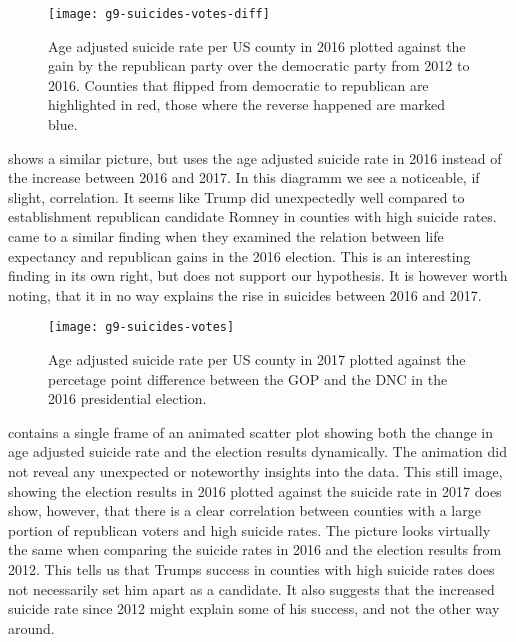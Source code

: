 \begin{figure}[tb]
\centering
\texttt{[image: g9-suicides-votes-diff]}
\caption{Age adjusted suicide rate per US county in 2016 plotted against the gain by the republican party over the democratic party from 2012 to 2016. Counties that flipped from democratic to republican are highlighted in red, those where the reverse happened are marked blue.}
\label{fig:suicides-votes-diff}
\end{figure}

\par
{} shows a similar picture, but uses the age adjusted suicide rate in 2016 instead of the increase between 2016 and 2017.
In this diagramm we see a noticeable, if slight, correlation.
It seems like Trump did unexpectedly well compared to establishment republican candidate Romney in counties with high suicide rates.
\cite{goldman2018} came to a similar finding when they examined the relation between life expectancy and republican gains in the 2016 election.
This is an interesting finding in its own right, but does not support our hypothesis.
It is however worth noting, that it in no way explains the rise in suicides between 2016 and 2017.

\begin{figure}[tb]
\centering
\texttt{[image: g9-suicides-votes]}
\caption{Age adjusted suicide rate per US county in 2017 plotted against the percetage point difference between the GOP and the DNC in the 2016 presidential election.}
\label{fig:suicides-votes}
\end{figure}

\par
{} contains a single frame of an animated scatter plot showing both the change in age adjusted suicide rate and the election results dynamically.
The animation did not reveal any unexpected or noteworthy insights into the data.
This still image, showing the election results in 2016 plotted against the suicide rate in 2017 does show, however, that there is a clear correlation between counties with a large portion of republican voters and high suicide rates.
The picture looks virtually the same when comparing the suicide rates in 2016 and the election results from 2012.
This tells us that Trumps success in counties with high suicide rates does not necessarily set him apart as a candidate.
It also suggests that the increased suicide rate since 2012 might explain some of his success, and not the other way around.